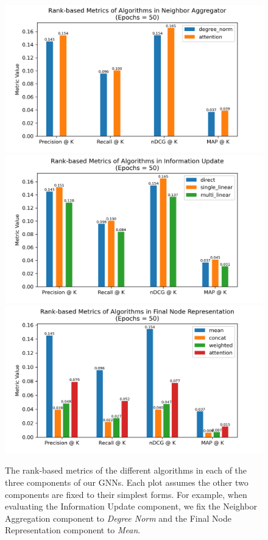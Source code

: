 \documentclass{article}
\begin{document}
\begin{figure}[H]
    \centering
    \includegraphics[width=.8\textwidth]{figs/neighbor_aggregator.png}
    \includegraphics[width=.8\textwidth]{figs/info_updater.png}
    \includegraphics[width=.8\textwidth]{figs/final_node_repr.png}
    \caption{The rank-based metrics of the different algorithms in each of the three components of our GNNs. Each plot assumes the other two components are fixed to their simplest forms. For example, when evaluating the Information Update component, we fix the Neighbor Aggregation component to \textit{Degree Norm} and the Final Node Representation component to \textit{Mean}.}
    \label{fig:metrics-individual-components}
\end{figure}
\end{document}
